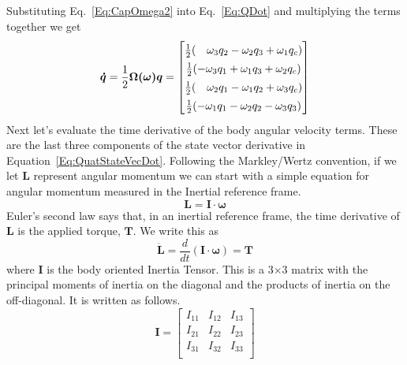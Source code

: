 %
Substituting Eq.~\ref{Eq:CapOmega2} into Eq.~\ref{Eq:QDot} and multiplying the
terms together we get
%
\begin{equation}
\renewcommand{\arraystretch}{1.4}
    \boldsymbol{\dot{q}} =
        \frac{1}{2}\boldsymbol{\Omega(\omega)q} =
        \begin{bmatrix}
        \frac{1}{2}( \hspace{0.35cm}\omega_3 q_2 -\omega_2 q_3 +\omega_1 q_c )\\
        \frac{1}{2}(               -\omega_3 q_1 +\omega_1 q_3 +\omega_2 q_c )\\
        \frac{1}{2}( \hspace{0.35cm}\omega_2 q_1 -\omega_1 q_2 +\omega_3 q_c )\\
        \frac{1}{2}(               -\omega_1 q_1 -\omega_2 q_2 -\omega_3 q_3 )\\
        \end{bmatrix}
    \label{Eq:QuatEOMs}
\end{equation}
%
Next let's evaluate the time derivative of the body angular velocity terms.
These are the last three components of the state vector derivative in
Equation~\ref{Eq:QuatStateVecDot}.  Following the Markley/Wertz convention, if
we let $\mathbf{L}$ represent angular momentum we can start with a simple
equation for angular momentum measured in the Inertial reference frame.
%
\begin{equation}
    \mathbf{L} =
        \mathbf{I} \cdot \boldsymbol{\omega}
    \label{Eq:AngMom}
\end{equation}
%
Euler's second law says that, in an inertial reference frame, the time
derivative of $\mathbf{L}$ is the applied torque, $\mathbf{T}$.  We write this
as
%
\begin{equation}
	\mathbf{\dot{L}} =
        \frac{d}{dt}(\mathbf{I}\cdot\boldsymbol{\omega})
        =
        \mathbf{T}
    \label{Eq:Eulers2ndLaw}
\end{equation}
%
where $\mathbf{I}$ is the body oriented Inertia Tensor.  This is a 3$\times$3
matrix with the principal moments of inertia on the diagonal and the products of
inertia on the off-diagonal.  It is written as follows.
%
\begin{equation}
    \mathbf{I} =
        \begin{bmatrix}
        I_{11} & I_{12} & I_{13} \\
        I_{21} & I_{22} & I_{23} \\
        I_{31} & I_{32} & I_{33} \\
        \end{bmatrix}
    \label{Eq:FullInertiaTensor}
\end{equation}
